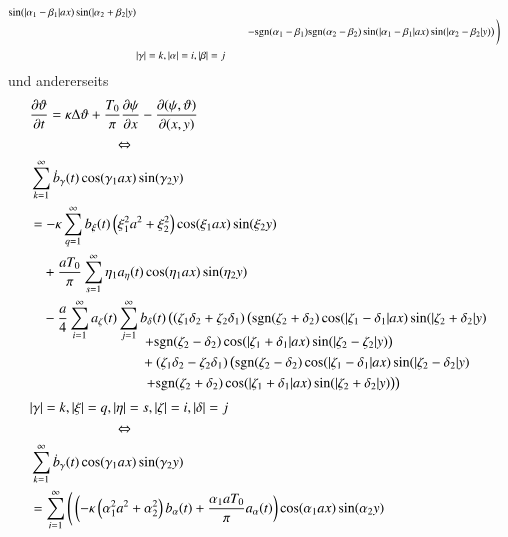 \begin{refsection}
\begin{align*}
\sin(|\alpha_1 - \beta_1|ax)\sin(|\alpha_2 + \beta_2|y)
\\[-1.0ex]
&\phantom{=bb-4paatabb\sum\sum.{}}
\left.
-
\sgn(\alpha_1 - \beta_1)\sgn(\alpha_2 - \beta_2)
\sin(|\alpha_1 - \beta_1|ax)\sin(|\alpha_2 - \beta_2|y)
\right)
\Bigg)
\\
&|\gamma| = k, |\alpha| = i, |\beta| = j
\end{align*}
und andererseits
\begin{align*}
&\frac{\partial\vartheta}{\partial t}
=
\kappa\Delta\vartheta
+ \frac{T_0}{\pi}\frac{\partial\psi}{\partial x}
- \frac{\partial(\psi,\vartheta)}{\partial(x,y)}
\\
&\qquad \qquad \qquad \Leftrightarrow
\\
&
\sum_{k = 1}^{\infty}
\dot{b}_{\gamma}(t)
\cos(\gamma_1 ax) \sin(\gamma_2 y)
\\
&=
-
\kappa
\sum_{q = 1}^{\infty}
b_{\xi}(t)
\left(\xi_1^2 a^2 + \xi_2^2\right)
\cos(\xi_1 ax) \sin(\xi_2 y)
\\
&\phantom{={}}
+
\frac{a T_0}{\pi}
\sum_{s = 1}^{\infty}
\eta_1
a_{\eta}(t)
\cos(\eta_1 ax) \sin(\eta_2 y)
\\
&\phantom{={}}
-
\frac{a}{4}
\sum_{i = 1}^{\infty}
a_{\zeta}(t)
\sum_{j = 1}^{\infty}
b_{\delta}(t)
\left(
\left(\zeta_1 \delta_2 + \zeta_2 \delta_1 \right)
\left(
\sgn(\zeta_2 + \delta_2)
\cos(|\zeta_1 - \delta_1|ax)\sin(|\zeta_2 + \delta_2|y)
\right.
\right.
\\[-2.5ex]
&\phantom{=-abbb\sum\sum.....{}}
\left.
+
\sgn(\zeta_2 - \delta_2)
\cos(|\zeta_1 + \delta_1|ax)\sin(|\zeta_2 - \zeta_2|y)
\right)
\\[-1.0ex]
&\phantom{=-abbb\sum\sum.....{}}
+
\left(\zeta_1 \delta_2 - \zeta_2 \delta_1 \right)
\left(
\sgn(\zeta_2 - \delta_2)
\cos(|\zeta_1 - \delta_1|ax)\sin(|\zeta_2 - \delta_2|y)
\right.
\\[-1.0ex]
&\phantom{=-abbb\sum\sum.....{}}
\left.
\left.
+
\sgn(\zeta_2 + \delta_2)
\cos(|\zeta_1 + \delta_1|ax)\sin(|\zeta_2 + \delta_2|y)
\right)
\right)
\\
&|\gamma| = k, |\xi| = q, |\eta| = s, |\zeta| = i, |\delta| = j
\\
&\qquad \qquad \qquad \Leftrightarrow
\\
&\sum_{k = 1}^{\infty}
\dot{b}_{\gamma}(t)
\cos(\gamma_1 ax) \sin(\gamma_2 y)
\\
&=
\sum_{i = 1}^{\infty}
\Bigg(
\left(
-
\kappa
\left(\alpha_1^2 a^2 + \alpha_2^2\right)
b_{\alpha}(t)
+
\frac{\alpha_1 a T_0}{\pi}
a_{\alpha}(t)
\right)
\cos(\alpha_1 ax) \sin(\alpha_2 y)

\end{align*}
\end{refsection}
